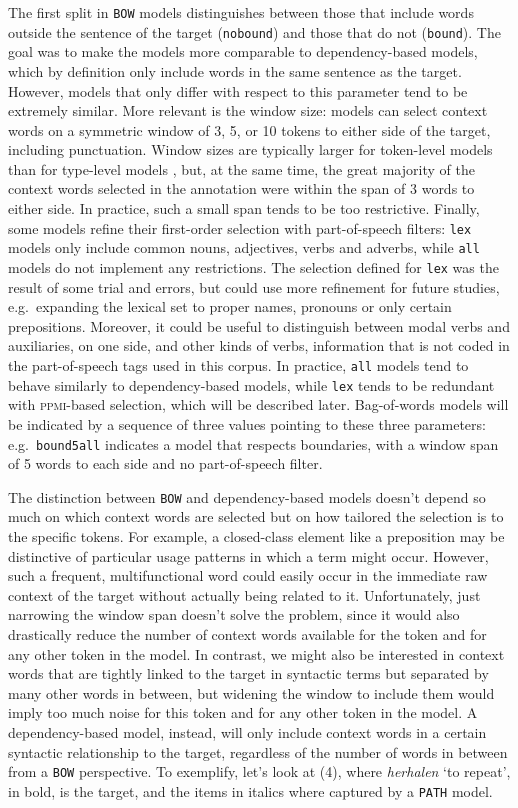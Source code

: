 \documentclass[
]{book}
\begin{document}
The first split in \texttt{BOW} models distinguishes between those that include words outside the sentence of the target (\texttt{nobound}) and those that do not (\texttt{bound}). The goal was to make the models more comparable to dependency-based models, which by definition only include words in the same sentence as the target. However, models that only differ with respect to this parameter tend to be extremely similar.
More relevant is the window size: models can select context words on a symmetric window of 3, 5, or 10 tokens to either side of the target, including punctuation. Window sizes are typically larger for token-level models than for type-level models \autocites[e.g.][]{schutze_1998,depascale_2019}, but, at the same time, the great majority of the context words selected in the annotation were within the span of 3 words to either side. In practice, such a small span tends to be too restrictive.
Finally, some models refine their first-order selection with part-of-speech filters: \texttt{lex} models only include common nouns, adjectives, verbs and adverbs, while \texttt{all} models do not implement any restrictions. The selection defined for \texttt{lex} was the result of some trial and errors, but could use more refinement for future studies, e.g.~expanding the lexical set to proper names, pronouns or only certain prepositions. Moreover, it could be useful to distinguish between modal verbs and auxiliaries, on one side, and other kinds of verbs, information that is not coded in the part-of-speech tags used in this corpus. In practice, \texttt{all} models tend to behave similarly to dependency-based models, while \texttt{lex} tends to be redundant with \textsc{ppmi}-based selection, which will be described later.
Bag-of-words models will be indicated by a sequence of three values pointing to these three parameters: e.g.~\texttt{bound5all} indicates a model that respects boundaries, with a window span of 5 words to each side and no part-of-speech filter.

The distinction between \texttt{BOW} and dependency-based models doesn't depend so much on which context words are selected but on how tailored the selection is to the specific
tokens. For example, a closed-class element like a preposition may be distinctive of particular usage patterns in which a term might occur. However, such a frequent, multifunctional word could easily occur in the immediate raw context of the target without actually being related to it. Unfortunately, just narrowing the window span doesn't solve the problem, since it would also drastically reduce the number of context words available for the token and for any other token in the model.
In contrast, we might also be interested in context words that are tightly linked to the target in syntactic terms but separated by many other words in between, but widening the window to include them would imply too much noise for this token and for any other token in the model.
A dependency-based model, instead, will only include context words in a certain syntactic relationship to the target, regardless of the number of words in between from a \texttt{BOW} perspective.
To exemplify, let's look at (4), where \emph{herhalen} `to repeat', in bold, is the target, and the items in italics where captured by a \texttt{PATH} model.
\end{document}
